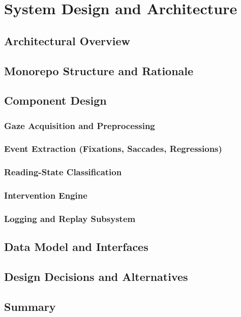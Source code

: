 \chapter{System Design and Architecture}
\label{ch:design}

\section{Architectural Overview}

\section{Monorepo Structure and Rationale}

\section{Component Design}
\subsection{Gaze Acquisition and Preprocessing}
\subsection{Event Extraction (Fixations, Saccades, Regressions)}
\subsection{Reading-State Classification}
\subsection{Intervention Engine}
\subsection{Logging and Replay Subsystem}

\section{Data Model and Interfaces}

\section{Design Decisions and Alternatives}

\section{Summary}
